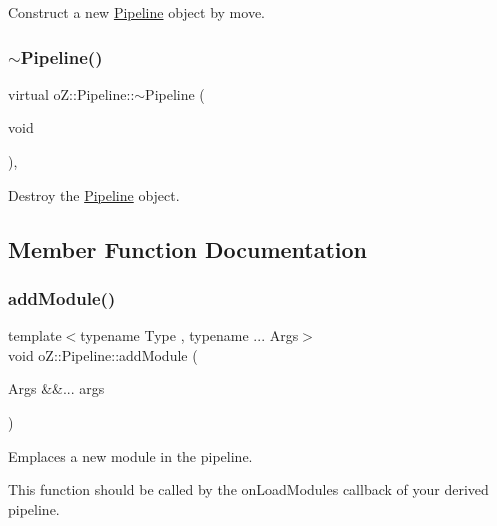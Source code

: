 Construct a new \mbox{\hyperlink{classo_z_1_1_pipeline}{Pipeline}} object by move. 

\mbox{\label{classo_z_1_1_pipeline_a91969687e5d9dccb384febbce62d5dd9}} 
\subsubsection{\texorpdfstring{$\sim$Pipeline()}{~Pipeline()}}
{\footnotesize\ttfamily virtual o\+Z\+::\+Pipeline\+::$\sim$\+Pipeline (\begin{DoxyParamCaption}\item[{void}]{ }\end{DoxyParamCaption})\hspace{0.3cm}{\ttfamily [virtual]}, {\ttfamily [default]}}



Destroy the \mbox{\hyperlink{classo_z_1_1_pipeline}{Pipeline}} object. 



\subsection{Member Function Documentation}
\mbox{\label{classo_z_1_1_pipeline_a797f98947aace930fbb15cd6b2d9f726}} 
\subsubsection{\texorpdfstring{addModule()}{addModule()}}
{\footnotesize\ttfamily template$<$typename Type , typename ... Args$>$ \\
void o\+Z\+::\+Pipeline\+::add\+Module (\begin{DoxyParamCaption}\item[{Args \&\&...}]{args }\end{DoxyParamCaption})}



Emplaces a new module in the pipeline. 

This function should be called by the on\+Load\+Modules callback of your derived pipeline. \mbox{\label{classo_z_1_1_pipeline_aa8aa56af891b2d889e7c21198daa1451}} 
